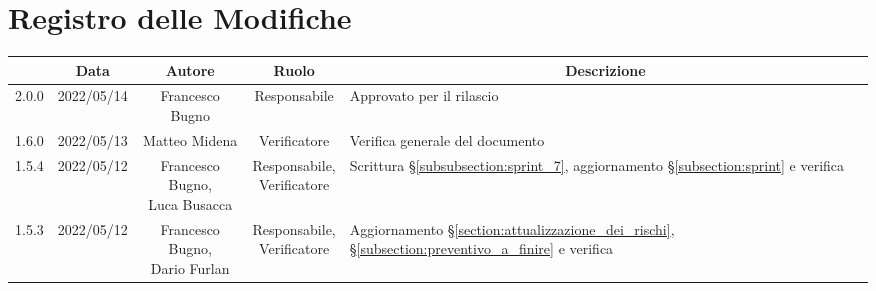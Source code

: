 \thispagestyle{empty}
\section*{Registro delle Modifiche}

\begin{center}
	\renewcommand{\arraystretch}{1.8}
	\begin{longtable}[c]{c | c | c | c | p{5cm}}
		\rowcolor[HTML]{125E28}
		\multicolumn{1}{c}{\color[HTML]{FFFFFF} \textbf{Versione}} &
		\multicolumn{1}{c}{\color[HTML]{FFFFFF} \textbf{Data}}     &
		\multicolumn{1}{c}{\color[HTML]{FFFFFF} \textbf{Autore}}   &
		\multicolumn{1}{c}{\color[HTML]{FFFFFF} \textbf{Ruolo}}    &
		\multicolumn{1}{c}{\color[HTML]{FFFFFF} \textbf{Descrizione}}                                                                                                                                                                                                                 \\
		\endhead
		2.0.0                                                      & 2022/05/14 & Francesco Bugno                        & Responsabile   & Approvato per il rilascio                                                                                                                 \\
		1.6.0                                                      & 2022/05/13 & Matteo Midena                          & Verificatore   & Verifica generale del documento                                                                                                           \\
		1.5.4                                                      & 2022/05/12 & \Shortunderstack{Francesco Bugno,                                                                                                                                                                   \\Luca Busacca} & \Shortunderstack{Responsabile,\\Verificatore} & Scrittura §\ref{subsubsection:sprint_7}, aggiornamento §\ref{subsection:sprint} e verifica\\
		1.5.3                                                      & 2022/05/12 & \Shortunderstack{Francesco Bugno,                                                                                                                                                                   \\Dario Furlan} & \Shortunderstack{Responsabile,\\Verificatore} & Aggiornamento §\ref{section:attualizzazione_dei_rischi}, §\ref{subsection:preventivo_a_finire} e verifica\\

\end{longtable}
\end{center}
